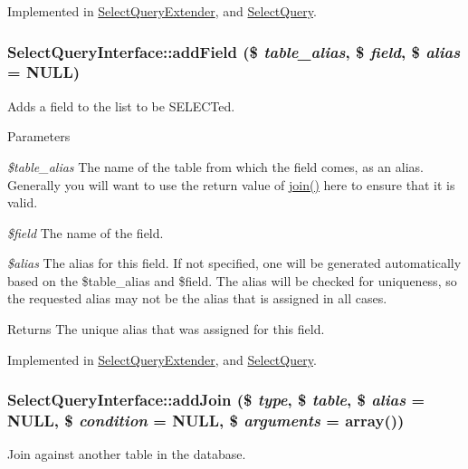 Implemented in \hyperlink{classSelectQueryExtender_a6e05e811e495e6f36fb0ec1ef21abbc1}{SelectQueryExtender}, and \hyperlink{classSelectQuery_a8d99c03f6dea06e698640cf77c0a1d21}{SelectQuery}.\hypertarget{interfaceSelectQueryInterface_a1c8331825723867ceba20436a6ea5ed1}{
\subsubsection[{addField}]{\setlength{\rightskip}{0pt plus 5cm}SelectQueryInterface::addField (\$ {\em table\_\-alias}, \/  \$ {\em field}, \/  \$ {\em alias} = {\ttfamily NULL})}}
\label{interfaceSelectQueryInterface_a1c8331825723867ceba20436a6ea5ed1}
Adds a field to the list to be SELECTed.


\begin{DoxyParams}{Parameters}
\item[{\em \$table\_\-alias}]The name of the table from which the field comes, as an alias. Generally you will want to use the return value of \hyperlink{interfaceSelectQueryInterface_a596614bc76873c1487f87d30f892a651}{join()} here to ensure that it is valid. \item[{\em \$field}]The name of the field. \item[{\em \$alias}]The alias for this field. If not specified, one will be generated automatically based on the \$table\_\-alias and \$field. The alias will be checked for uniqueness, so the requested alias may not be the alias that is assigned in all cases. \end{DoxyParams}
\begin{DoxyReturn}{Returns}
The unique alias that was assigned for this field. 
\end{DoxyReturn}


Implemented in \hyperlink{classSelectQueryExtender_ab5d7e784fcc0f74caa07a53ddc423f05}{SelectQueryExtender}, and \hyperlink{classSelectQuery_a8f5cef012b0f3111a5e6b8bcc47bacea}{SelectQuery}.\hypertarget{interfaceSelectQueryInterface_a974ba99af27e9b77d7f5fc69ec81bd45}{
\subsubsection[{addJoin}]{\setlength{\rightskip}{0pt plus 5cm}SelectQueryInterface::addJoin (\$ {\em type}, \/  \$ {\em table}, \/  \$ {\em alias} = {\ttfamily NULL}, \/  \$ {\em condition} = {\ttfamily NULL}, \/  \$ {\em arguments} = {\ttfamily array()})}}
\label{interfaceSelectQueryInterface_a974ba99af27e9b77d7f5fc69ec81bd45}
Join against another table in the database.

